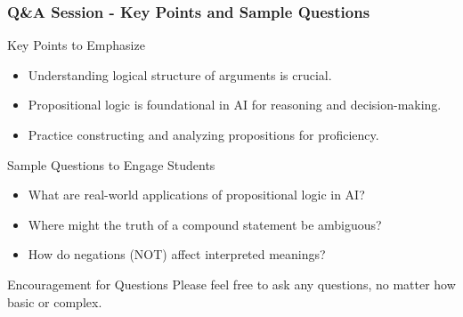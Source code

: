 \documentclass[aspectratio=169]{beamer}
\begin{document}
\begin{frame}[fragile]
    \frametitle{Q\&A Session - Key Points and Sample Questions}
    \begin{block}{Key Points to Emphasize}
        \begin{itemize}
            \item Understanding logical structure of arguments is crucial.
            \item Propositional logic is foundational in AI for reasoning and decision-making.
            \item Practice constructing and analyzing propositions for proficiency.
        \end{itemize}
    \end{block}

    \begin{block}{Sample Questions to Engage Students}
        \begin{itemize}
            \item What are real-world applications of propositional logic in AI?
            \item Where might the truth of a compound statement be ambiguous?
            \item How do negations (NOT) affect interpreted meanings?
        \end{itemize}
    \end{block}

    \begin{block}{Encouragement for Questions}
        Please feel free to ask any questions, no matter how basic or complex.
    \end{block}
\end{frame}
\end{document}
